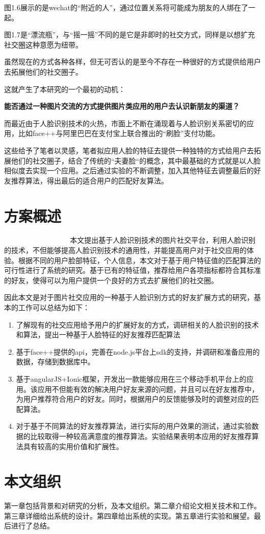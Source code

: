 图1.6展示的是wechat的“附近的人”，通过位置关系将可能成为朋友的人绑在了一起。

图1.7是“漂流瓶”，与“摇一摇”不同的是它是非即时的社交方式，同样是以想扩充社交圈这种意愿为纽带。

虽然现在的方式各种各样，但无可否认的是至今不存在一种很好的方式提供给用户去拓展他们的社交圈子。

这就产生了本研究的一个最初的动机：

 \textbf{能否通过一种图片交流的方式提供图片类应用的用户去认识新朋友的渠道？}

而最近由于人脸识别技术的火热，市面上不断在涌现着与人脸识别关系密切的应用，比如face++与阿里巴巴在支付宝上联合推出的“刷脸”支付功能。

这些给予了笔者以灵感，笔者拟应用人脸的特征去提供一种独特的方式给用户去拓展他们的社交圈子，结合了传统的“夫妻脸“的概念，其中最基础的方式就是以人脸相似度去实现一个应用。之后通过实验的不断调整，加入其他特征去调整最后的好友推荐算法，得出最后的适合用户的匹配好友算法。
\section{方案概述}
􏰉􏴳􏰭􏴴􏴵􏴶􏴷􏰿􏴸􏴹􏴘􏰏􏲦􏲜􏱲􏴺􏰭􏴻􏲆􏴻􏴼􏰏􏱦􏴷􏱜􏰒􏴽􏳯􏴾􏴿􏵀􏱾􏱜本文提出基于人脸识别技术的图片社交平台，利用人脸识别的技术，不但能够提高人脸识别技术的通用性，并能提高用户对于社交应用的体验。根据不同的用户脸部特征，个人信息，本文对于基于用户特征值的匹配算法的可行性进行了系统的研究。基于已有的特征值，推荐给用户各项指标都符合其标准的好友，使得可以为用户提供一个良好的方式去扩展他们的社交圈。


因此本文是对于图片社交应用的一种基于人脸识别方式的好友扩展方式的研究，基本的工作可以总结为如下：
\begin{enumerate}
\item 了解现有的社交应用给予用户的扩展好友的方式，调研相关的人脸识别的技术和算法，提出一种基于人脸特征的好友推荐匹配算法
\item 基于face++提供的api，完善在node.js平台上sdk的支持，并调研和准备应用的数据，存储到数据库中。
\item 基于angularJS+Ionic框架，开发出一款能够应用在三个移动手机平台上的应用。该应用不但能有效的解决用户好友来源的问题，并且可以在好友推荐中，为用户推荐符合用户的好友。同时，根据用户的反馈能够及时的调整对应的匹配算法。
\item 对于基于不同算法的好友推荐算法，进行实际的用户效果的测试，通过实验数据的比较取得一种较高满意度的推荐算法。实验结果表明本应用的好友推荐算法具有较高的实用价值和扩展性。
\end{enumerate}

\section{本文组织}
第一章包括背景和对研究的分析，及本文组织。第二章介绍论文相关技术和工作。第三章详细给出系统的设计。第四章给出系统的实现。第五章进行实验和展望。最后进行了总结。

